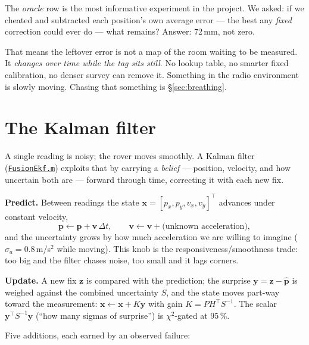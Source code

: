 \documentclass[11pt,a4paper]{article}
\newcommand{\gh}[2]{\href{https://github.com/AdershM-2/UWB_3/blob/main/#1}{\texttt{#2}}}
\begin{document}
The \emph{oracle} row is the most informative experiment in the project. We asked:
if we cheated and subtracted each position's own average error --- the best any
\emph{fixed} correction could ever do --- what remains? Answer: 72\,mm, not zero.

\begin{plainwords}
That means the leftover error is not a map of the room waiting to be measured.
It \emph{changes over time while the tag sits still}. No lookup table, no smarter
fixed calibration, no denser survey can remove it. Something in the radio
environment is slowly moving. Chasing that something is \S\ref{sec:breathing}.
\end{plainwords}

\section{The Kalman filter}
\label{sec:ekf}

A single reading is noisy; the rover moves smoothly. A Kalman filter
(\gh{matlab/+dune/FusionEkf.m}{FusionEkf.m}) exploits that by carrying a
\emph{belief} --- position, velocity, and how uncertain both are --- forward
through time, correcting it with each new fix.

\textbf{Predict.} Between readings the state
$\mathbf{x} = [p_x, p_y, v_x, v_y]^\top$ advances under constant velocity,
\begin{equation}
\mathbf{p} \leftarrow \mathbf{p} + \mathbf{v}\,\Delta t,
\qquad
\mathbf{v} \leftarrow \mathbf{v} + \text{(unknown acceleration)},
\end{equation}
and the uncertainty grows by how much acceleration we are willing to imagine
($\sigma_a = 0.8$\,m/s$^2$ while moving). This knob is the responsiveness/smoothness
trade: too big and the filter chases noise, too small and it lags corners.

\textbf{Update.} A new fix $\mathbf{z}$ is compared with the prediction; the
surprise $\mathbf{y} = \mathbf{z} - \hat{\mathbf{p}}$ is weighed against the
combined uncertainty $S$, and the state moves part-way toward the measurement:
$\mathbf{x} \leftarrow \mathbf{x} + K\mathbf{y}$ with gain
$K = P H^\top S^{-1}$. The scalar $\mathbf{y}^\top S^{-1}\mathbf{y}$ (``how many
sigmas of surprise'') is $\chi^2$-gated at 95\,\%.

Five additions, each earned by an observed failure:
\end{document}
